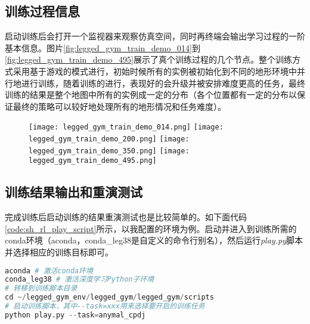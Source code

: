 \subsection[训练过程信息]{训练过程信息}
启动训练后会打开一个监视器来观察仿真空间，同时再终端会输出学习过程的一阶基本信息。图片\ref{fig:legged_gym_train_demo_014}到\ref{fig:legged_gym_train_demo_495}展示了真个训练过程的几个节点。整个训练方式采用基于游戏的模式进行\cite[p3]{Rudin_Hoeller_Reist_Hutter_2021}，初始时候所有的实例被初始化到不同的地形环境中并行地进行训练，随着训练的进行，表现好的会升级并被安排难度更高的任务，最终训练的结果是整个地图中所有的实例成一定的分布（各个位置都有一定的分布以保证最终的策略可以较好地处理所有的地形情况和任务难度）。

\begin{figure}
    \centering
    {\texttt{[image: legged\_gym\_train\_demo\_014.png]}}
    {\texttt{[image: legged\_gym\_train\_demo\_200.png]}}
    {\texttt{[image: legged\_gym\_train\_demo\_350.png]}}
    {\texttt{[image: legged\_gym\_train\_demo\_495.png]}}
\end{figure}

\subsection[训练结果输出和重演测试]{训练结果输出和重演测试}
完成训练后启动训练的结果重演测试也是比较简单的。如下面代码\ref{code:sh_rl_play_script}所示，以我配置的环境为例。启动并进入到训练所需的conda环境（aconda，conda\_leg38是自定义的命令行别名），然后运行\emph{play.py}脚本并选择相应的训练目标即可。
\noindent
\begin{minipage}{\linewidth}
\begin{lstlisting}[language=python,caption={自定义的RL重演.sh快捷启动脚本},xleftmargin=20pt,label={code:sh_rl_play_script}]
aconda # 激活conda环境
conda_leg38 # 激活深度学习Python子环境
# 转移到训练脚本目录
cd ~/legged_gym_env/legged_gym/legged_gym/scripts 
# 启动训练脚本，其中--task=xxx用来选择要开启的训练任务
python play.py --task=anymal_cpdj 
\end{lstlisting}
\end{minipage}

